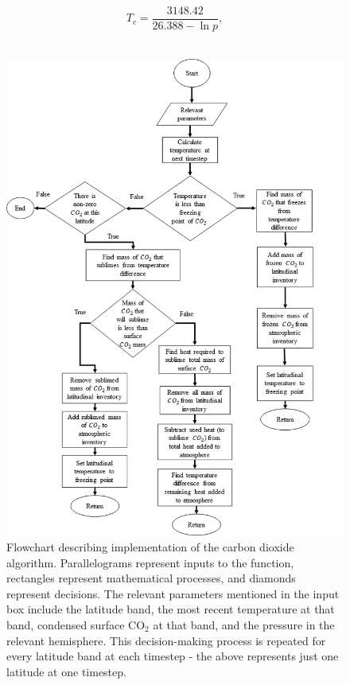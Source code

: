 \documentclass[12pt,onecolumn]{revtex4-2}    %
\begin{document}
\begin{equation}
T_{c} = \frac{3148.42}{26.388 - \ln{p}},
\end{equation}
\

\begin{figure}[H]
\centering
\includegraphics[width = 15cm]{flowchart2.png}
\caption{Flowchart describing implementation of the carbon dioxide algorithm. Parallelograms represent inputs to the function, rectangles represent mathematical processes, and diamonds represent decisions. The relevant parameters mentioned in the input box include the latitude band, the most recent temperature at that band, condensed surface $\mathrm{CO_2}$ at that band, and the pressure in the relevant hemisphere. This decision-making process is repeated for every latitude band at each timestep - the above represents just one latitude at one timestep.}
\label{fig:test}
\end{figure}
\
\end{document}
